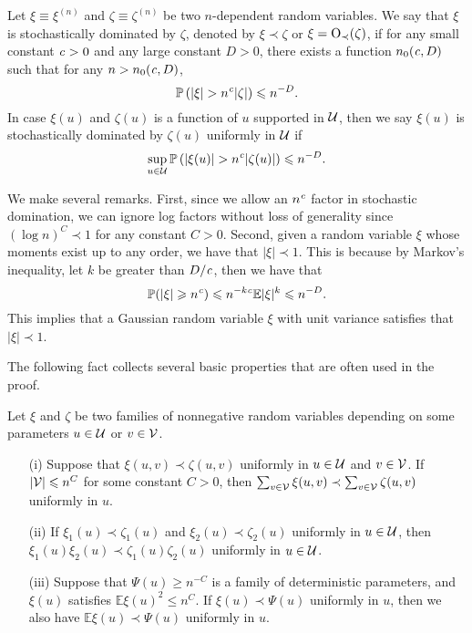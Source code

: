 \begin{definition}\label{stoch_domination}
Let $\xi\equiv \xi^{(n)}$ and $\zeta\equiv \zeta^{(n)}$ be two $n$-dependent random variables.
We say that $\xi$ is stochastically dominated by $\zeta$, denoted by $\xi\prec \zeta$ or $\xi=\OO_\prec(\zeta)$, if for any small constant $\e > 0$ and any large constant $D > 0$, there exists a function $n_0(\e, D)$ such that for any $n > n_0(\e, D)$,
\[ \bbP\left(|\xi| >n^\e |\zeta|\right)\le n^{-D}. \]
In case $\xi(u)$ and $\zeta(u)$ is a function of $u$ supported in $\cal U$, then we say $\xi(u)$ is stochastically dominated by $\zeta(u)$ uniformly in $\cal U$ if %
\[ \sup_{u\in \cal U}\bbP\left(|\xi(u)|>n^\e |\zeta(u)|\right)\le n^{-D}. \]
\end{definition}

We make several remarks.
First, since we allow an $n^\e$ factor in stochastic domination, we can ignore log factors without loss of generality since $(\log n)^C\prec 1$ for any constant $C>0$.
Second, given a random variable $\xi$ whose moments exist up to any order, we have that $|\xi|\prec 1$.
This is because by Markov's inequality, let $k$ be greater than $D/ \e$, then we have that
$$ \P(|\xi|\ge n^{\e})\le n^{-k\e}{\E |\xi|^k}\le n^{-D}.$$
This implies that a Gaussian random variable $\xi$ with unit variance satisfies that $|\xi|\prec 1$.

The following fact collects several basic properties that are often used in the proof.
\begin{fact}\label{lem_stodomin}
Let $\xi$ and $\zeta$ be two families of nonnegative random variables depending on some parameters $u\in \cal U$ or $v\in \cal V$.
\begin{itemize}
\item[(i)] Suppose that $\xi (u,v)\prec \zeta(u,v)$ uniformly in $u\in \cal U$ and $v\in \cal V$. If $|\cal V|\le n^C$ for some constant $C>0$, then $\sum_{v\in \cal V} \xi(u,v) \prec \sum_{v\in \cal V} \zeta(u,v)$ uniformly in $u$.

\item[(ii)] If $\xi_1 (u)\prec \zeta_1(u)$ and $\xi_2 (u)\prec  \zeta_2(u)$ uniformly in $u\in \cal U$, then $\xi_1(u)\xi_2(u) \prec \zeta_1(u) \zeta_2(u)$ uniformly in $u\in \cal U$.

\item[(iii)] Suppose that $\Psi(u)\ge n^{-C}$ is a family of deterministic parameters, and $\xi(u)$ satisfies $\mathbb E\xi(u)^2 \le n^C$. If $\xi(u)\prec \Psi(u)$ uniformly in $u$, then we also have $\mathbb E\xi(u) \prec \Psi(u)$ uniformly in $u$.
\end{itemize}
\end{fact}

